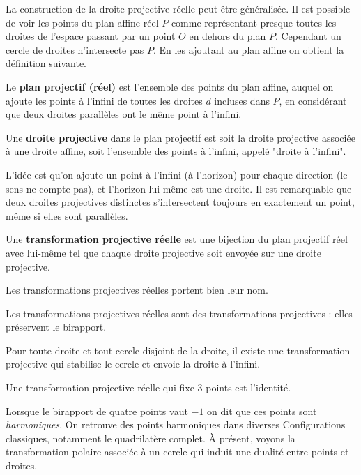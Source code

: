 La construction de la droite projective réelle peut être généralisée. Il est possible de voir les points du plan affine réel $P$ comme représentant presque toutes les droites de l'espace passant par un point $O$ en dehors du plan $P$. Cependant un cercle de droites n'intersecte pas $P$. En les ajoutant au plan affine on obtient la définition suivante.


\begin{dfn}
Le \textbf{plan projectif (réel)} est l'ensemble des points du plan affine, auquel on ajoute les points à l'infini de toutes les droites $d$ incluses dans $P$, en considérant que deux droites parallèles ont le même point à l'infini.

\medskip

Une \textbf{droite projective} dans le plan projectif est soit la droite projective associée à une droite affine, soit l'ensemble des points à l'infini, appelé "droite à l'infini".
\end{dfn}


L'idée est qu'on ajoute un point à l'infini (à l'horizon) pour chaque direction (le sens ne compte pas), et l'horizon lui-même est une droite. Il est remarquable que deux droites projectives distinctes s'intersectent toujours en exactement un point, même si elles sont parallèles.

\begin{dfn}
Une \textbf{transformation projective réelle} est une bijection du plan projectif réel avec lui-même tel que chaque droite projective soit envoyée sur une droite projective.
\end{dfn}


Les transformations projectives réelles portent bien leur nom.


\begin{pro}
Les transformations projectives réelles sont des transformations projectives : elles préservent le birapport.

\medskip

Pour toute droite et tout cercle disjoint de la droite, il existe une transformation projective qui stabilise le cercle et envoie la droite à l'infini.

\medskip

Une transformation projective réelle qui fixe $3$ points est l'identité.
\end{pro}


Lorsque le birapport de quatre points vaut $-1$ on dit que ces points sont \textit{harmoniques}. On retrouve des points harmoniques dans diverses Configurations classiques, notamment le quadrilatère complet. À présent, voyons la transformation polaire associée à un cercle qui induit une dualité entre points et droites.


